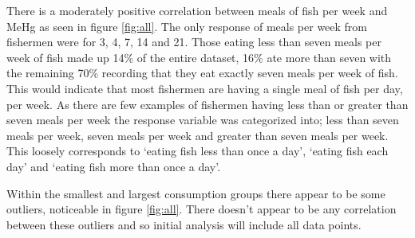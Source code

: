 \documentclass[twocolumn, 12pt]{report}
\begin{document}
There is a moderately positive correlation between meals of fish per week and MeHg as seen in figure \ref{fig:all}. The only response of meals per week from fishermen were for 3, 4, 7, 14 and 21. Those eating less than seven meals per week of fish made up 14\% of the entire dataset, 16\% ate more than seven with the remaining 70\% recording that they eat exactly seven meals per week of fish. This would indicate that most fishermen are having a single meal of fish per day, per week. As there are few examples of fishermen having less than or greater than seven meals per week the response variable was categorized into; less than seven meals per week, seven meals per week and greater than seven meals per week. This loosely corresponds to `eating fish less than once a day', `eating fish each day' and `eating fish more than once a day'.

Within the smallest and largest consumption groups there appear to be some outliers, noticeable in figure \ref{fig:all}. There doesn't appear to be any correlation between these outliers and so initial analysis will include all data points.
\end{document}
